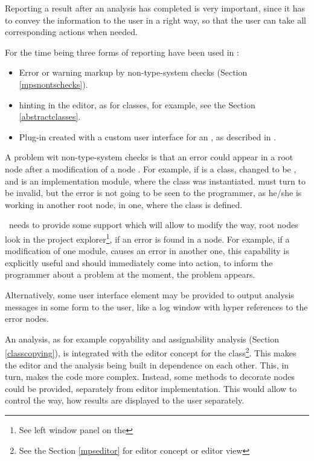 Reporting a result after an analysis has completed is very important, since it has to convey the 
information to the user in a right way, so that the user can take all corresponding actions when needed.

For the time being three forms of reporting have been used in \jbmps:

\begin{itemize}
 \item Error or warning markup by non-type-system checks (Section \ref{mpsnontschecks}).
 \item {} hinting in the editor, as for  classes, for example, see the Section \ref{abstractclasses}.
 \item Plug-in created with a custom user interface for an , as described in \cite{2012_ratiu_modular_dsls_and_analyses}.
\end{itemize}

A problem wit non-type-system checks is that an error could appear in a root node  after a modification of a node . For example, if  is a class,
changed to be , and  is an implementation module, where the class  was instantiated.  must turn to be invalid, but the error
is not going to be seen to the programmer, as he/she is working in another root node, in one, where the  class is defined.

\jbmps\ needs to provide some support which will allow to modify the way, root nodes look in the project explorer\footnote{See left window panel on the },
if an error is found in a node. For example, if a modification of one module, causes an error in another one, this capability is explicitly useful and should
immediately come into action, to inform the programmer about a problem at the moment, the problem appears.

Alternatively, some user interface element may be provided to output analysis messages in some form to the user, like a log window with hyper references to the error nodes.

An  analysis, as for example copyability and assignability analysis (Section \ref{classcopying}), is integrated with the editor concept for the 
class\footnote{See the Section \ref{mpseditor} for editor concept or editor view}. This makes the editor and the analysis being built in dependence on each other.
This, in turn, makes the code more complex. Instead, some methods to decorate nodes could be provided, separately from editor implementation. This 
would allow to control the way, how  results are displayed to the user separately.

